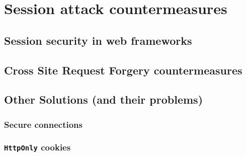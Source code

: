 \chapter{Session attack countermeasures}

\section{Session security in web frameworks}\label{frameworks}

\section{Cross Site Request Forgery countermeasures}\label{csrf-countermeasures}

\section{Other Solutions (and their problems)}\label{other-solutions}

\subsection{Secure connections}\label{ssl}

\subsection{\texttt{HttpOnly} cookies}\label{httponly}
